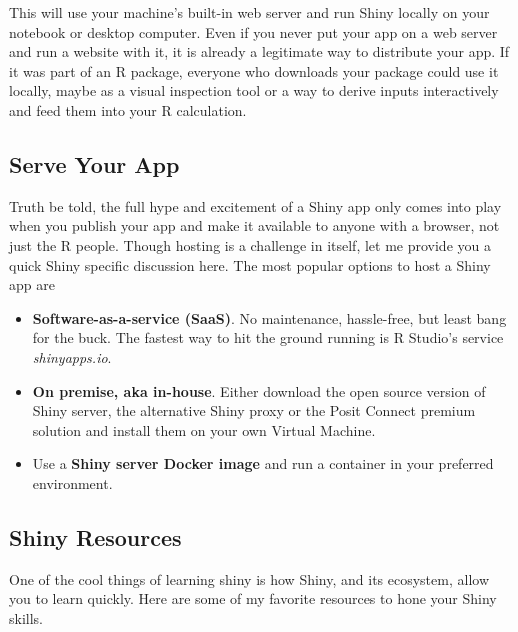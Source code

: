 \documentclass[
  12pt,
  letterpaper,
]{krantz}
\begin{document}
This will use your machine's built-in web server and run
Shiny locally on your notebook or desktop computer. Even if
you never put your app on a web server and run a website with it, it is
already a legitimate way to distribute your app. If it was part of an R
package, everyone who downloads your package could use it locally, maybe
as a visual inspection tool or a way to derive inputs interactively and
feed them into your R calculation.

\hypertarget{serve-your-app}{%
\subsection{Serve Your App}\label{serve-your-app}}

Truth be told, the full hype and excitement of a Shiny app
only comes into play when you publish your app and make it available to
anyone with a browser, not just the R people. Though hosting is a
challenge in itself, let me provide you a quick Shiny specific
discussion here. The most popular options to host a Shiny app are

\begin{itemize}
\item
  \textbf{Software-as-a-service (SaaS)}. No maintenance,
  hassle-free, but least bang for the buck. The fastest way to hit the
  ground running is R Studio's service \emph{shinyapps.io}.
\item
  \textbf{On premise, aka in-house}. Either download the open source
  version of Shiny server, the alternative Shiny proxy or the Posit
  Connect premium solution and install them on your own Virtual Machine.
\item
  Use a \textbf{Shiny server Docker image} and run a
  container in your preferred environment.
\end{itemize}

\hypertarget{shiny-resources}{%
\subsection{\texorpdfstring{Shiny
Resources}{Shiny Resources}}\label{shiny-resources}}

One of the cool things of learning shiny is how Shiny, and its
ecosystem, allow you to learn quickly. Here are some of my favorite
resources to hone your Shiny skills.
\end{document}
